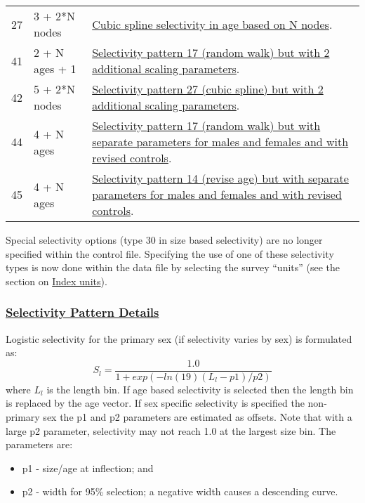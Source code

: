 \begin{longtable}{p{2cm} p{3cm} p{10cm}}
	27 \Tstrut & 3 + 2*N nodes & \hyperlink{cubic-spline}{Cubic spline selectivity in age based on N nodes}. \\
	41 \Tstrut & 2 + N ages + 1 & \hyperlink{RandomWalkScaling}{Selectivity pattern 17 (random walk) but with 2 additional scaling parameters}. \\
	42 \Tstrut & 5 + 2*N nodes & \hyperlink{CubicSplineScaling}{Selectivity pattern 27 (cubic spline) but with 2 additional scaling parameters}. \\
	44 \Tstrut & 4 + N ages & \hyperlink{Pattern44}{Selectivity pattern 17 (random walk) but with separate parameters for males and females and with revised controls}. \\
	45 \Tstrut & 4 + N ages & \hyperlink{Pattern45}{Selectivity pattern 14 (revise age) but with separate parameters for males and females and with revised controls}. \Bstrut\\
	\hline
\end{longtable}

Special selectivity options (type 30 in size based selectivity) are no longer specified within the control file. Specifying the use of one of these selectivity types is now done within the data file by selecting the survey ``units'' (see the section on \hyperlink{IndexUnits}{Index units}).

\hypertarget{SelPattern}{}
\subsubsection[Selectivity Pattern Details]{\protect\hyperlink{SelPattern}{Selectivity Pattern Details}}

\hypertarget{LogisticSelectivity}{}
Logistic selectivity for the primary sex (if selectivity varies by sex) is formulated as:
	\begin{equation}
	S_l = \frac{1.0}{1+exp(-ln(19)(L_l - p1)/p2)}
	\end{equation}
where $L_l$ is the length bin. If age based selectivity is selected then the length bin is replaced by the age vector. If sex specific selectivity is specified the non-primary sex the p1 and p2 parameters are estimated as offsets. Note that with a large p2 parameter, selectivity may not reach 1.0 at the largest size bin. The parameters are:
\begin{itemize}
	\item p1 - size/age at inflection; and
	\item p2 - width for 95\% selection; a negative width causes a descending curve.
\end{itemize}

